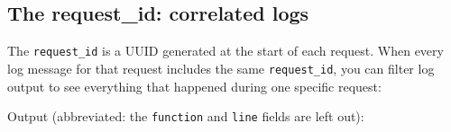 \subsection*{The request\_id: correlated logs}\label{35-observability:the-request-id-correlated-logs}

The \texttt{request\_id} is a UUID generated at the start of each request. When every log message for that request includes the same \texttt{request\_id}, you can filter log output to see everything that happened during one specific request:

\begin{codebox}[short]

\begin{Shaded}
\begin{Highlighting}[]
\NormalTok{ = }
\end{Highlighting}
\end{Shaded}

\end{codebox}

\noindent{}Output (abbreviated: the \texttt{function} and \texttt{line} fields are left out):

